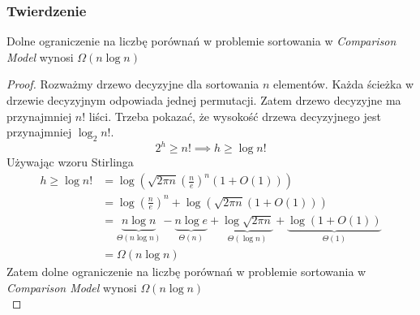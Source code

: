 \documentclass[11pt,a4paper]{article}
\begin{document}
\subsubsection{Twierdzenie}
Dolne ograniczenie na liczbę porównań w problemie sortowania w \textit{Comparison Model} wynosi $\Omega(n \log n)$
\begin{proof}
    Rozważmy drzewo decyzyjne dla sortowania $n$ elementów. Każda ścieżka w drzewie decyzyjnym odpowiada jednej permutacji. Zatem drzewo decyzyjne ma przynajmniej $n!$ liści. Trzeba pokazać, że wysokość drzewa decyzyjnego jest przynajmniej $\log_2 n!$.
    \[
        2^h \geq n! \implies h \geq \log n!
    \]
    Używając wzoru Stirlinga
    \begin{equation*}\begin{aligned}
        h \geq \log n! &= \log \left( \sqrt{2\pi n} \left( \frac{n}{e} \right)^n \left(1+ O(1)\right) \right)\\
                       &= \log \left(\frac{n}{e}\right)^n + \log \left(\sqrt{2\pi n}(1+O(1))\right) \\
                       &= \underbrace{n \log n}_{\Theta(n \log n)} - \underbrace{n \log e}_{\Theta(n)} + \underbrace{\log \sqrt{2\pi n}}_{\Theta(\log n)} + \underbrace{\log (1+O(1))}_{\Theta(1)} \\
                       &= \Omega(n \log n)
    \end{aligned}\end{equation*}
    Zatem dolne ograniczenie na liczbę porównań w problemie sortowania w \textit{Comparison Model} wynosi $\Omega(n \log n)$ \\
\end{proof}
\end{document}
